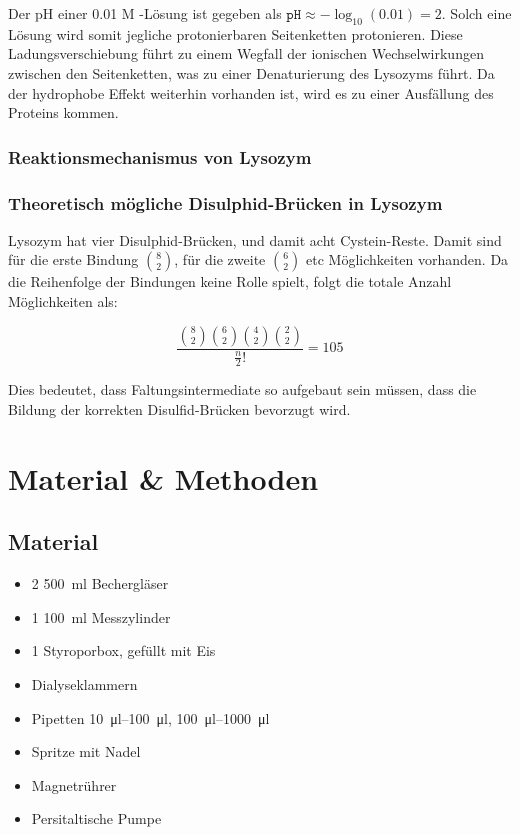 \documentclass[a4paper,german]{scrreprt}
\begin{document}
Der pH einer 0.01 M -Lösung ist gegeben als $\texttt{pH} \approx
-\log_{10}(0.01) = 2$. Solch eine Lösung wird somit jegliche protonierbaren
Seitenketten protonieren. Diese Ladungsverschiebung führt zu einem Wegfall der
ionischen Wechselwirkungen zwischen den Seitenketten, was zu einer
Denaturierung des Lysozyms führt. Da der hydrophobe Effekt weiterhin vorhanden
ist, wird es zu einer Ausfällung des Proteins kommen.

\subsection{Reaktionsmechanismus von Lysozym}

\subsection{Theoretisch mögliche Disulphid-Brücken in Lysozym}

Lysozym hat vier Disulphid-Brücken, und damit acht Cystein-Reste. Damit sind
für die erste Bindung $\binom{8}{2}$, für die zweite $\binom{6}{2}$ etc
Möglichkeiten vorhanden. Da die Reihenfolge der Bindungen keine Rolle spielt,
folgt die totale Anzahl Möglichkeiten als:

\[
	\frac{\binom{8}{2} \binom{6}{2} \binom{4}{2} \binom{2}{2}}{\frac{n}{2}!} = 105
\]

Dies bedeutet, dass Faltungsintermediate so aufgebaut sein müssen, dass die
Bildung der korrekten Disulfid-Brücken bevorzugt wird.

\chapter{Material \& Methoden}

\section{Material}

\begin{itemize}
\item 2 \SI{500}{ml} Bechergläser
\item 1 \SI{100}{ml} Messzylinder
\item 1 Styroporbox, gefüllt mit Eis
\item Dialyseklammern
\item Pipetten \SIrange{10}{100}{\ul}, \SIrange{100}{1000}{\ul}
\item Spritze mit Nadel
\item Magnetrührer
\item Persitaltische Pumpe
\end{itemize}
\end{document}
